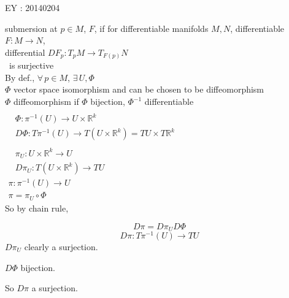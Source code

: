 EY : 20140204

submersion at $p \in M$, $F$, if for differentiable manifolds $M, N$, differentiable $F: M \to N$, \\
\quad differential $DF_p : T_p M \to T_{F(p)}N$ \\
\quad \, is surjective \\

By def., $\forall \, p \in M$, $\exists \, U, \Phi$ \\
\quad $\Phi$ vector space isomorphism and can be chosen to be diffeomorphism \\
\quad $\Phi$ diffeomorphism if $\Phi$ bijection, $\Phi^{-1}$ differentiable \\

$\begin{aligned}
& \quad \\ 
  & \Phi: \pi^{-1}(U) \to U \times \mathbb{R}^k \\
  & D\Phi : T\pi^{-1}(U) \to T(U \times \mathbb{R}^k ) = TU \times T\mathbb{R}^k 
\end{aligned}$ \\

$\begin{aligned} 
  & \quad \\
  & \pi_U : U \times \mathbb{R}^k \to U \\
  & D\pi_U : T(U \times \mathbb{R}^k ) \to TU \end{aligned}$  \\

$\begin{gathered}
\pi:\pi^{-1}(U) \to U \\
\pi = \pi_U \circ \Phi \end{gathered}$ \\

So by chain rule, 

\[
D\pi = D\pi_U D\Phi
\]
\[
D\pi : T\pi^{-1}(U) \to TU
\]
$D\pi_U$ clearly a surjection.  

$D\Phi$ bijection. 

So $D\pi$ a surjection.  

\hrulefill
